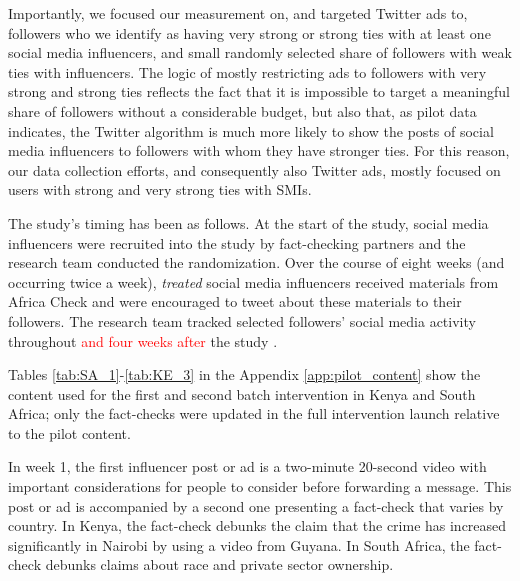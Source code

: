 Importantly, we focused our measurement on, and targeted Twitter ads to, followers who we identify as having very strong or strong ties with at least one social media influencers, and small randomly selected share of followers with weak ties with influencers. The logic of mostly restricting ads to followers with very strong and strong ties reflects the fact that it is impossible to target a meaningful share of followers without a considerable budget, but also that, as pilot data indicates, the Twitter algorithm is much more likely to show the posts of social media influencers to followers with whom they have stronger ties. For this reason, our data collection efforts, and consequently also Twitter ads, mostly focused on users with strong and very strong ties with SMIs.

The study's timing has been as follows. At the start of the study, social media influencers were recruited into the study by fact-checking partners and the research team conducted the randomization. Over the course of eight weeks (and occurring twice a week), \textit{treated} social media influencers received materials from Africa Check and were encouraged to tweet about these materials to their followers. The research team tracked selected followers' social media activity throughout \textcolor{red}{and four weeks after} the study %
.  %

Tables \ref{tab:SA_1}-\ref{tab:KE_3} in the Appendix \ref{app:pilot_content} show the content used for the first and second batch intervention in Kenya and South Africa; only the fact-checks were updated in the full intervention launch relative to the pilot content.


 In week 1, the first influencer post or ad is a two-minute 20-second video with %
important considerations for people to consider before forwarding a message. %
This post or ad is accompanied by a second one presenting a fact-check that varies by country. In Kenya, the fact-check debunks the claim that the crime has increased significantly in Nairobi by using a video from Guyana. In South Africa, the fact-check debunks claims about race and private sector ownership.

